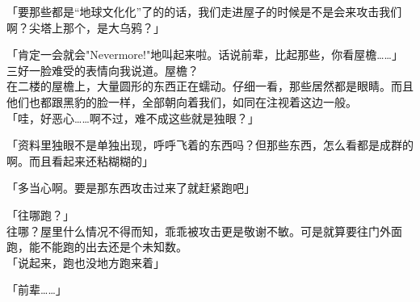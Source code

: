 「要那些都是“地球文化化”了的的话，我们走进屋子的时候是不是会来攻击我们啊？尖塔上那个，是大乌鸦？」

「肯定一会就会"Nevermore!"地叫起来啦。话说前辈，比起那些，你看屋檐……」\\

三好一脸难受的表情向我说道。屋檐？\\

在二楼的屋檐上，大量圆形的东西正在蠕动。仔细一看，那些居然都是眼睛。而且他们也都跟黑豹的脸一样，全部朝向着我们，如同在注视着这边一般。\\

「哇，好恶心……啊不过，难不成这些就是独眼？」

「资料里独眼不是单独出现，呼呼飞着的东西吗？但那些东西，怎么看都是成群的啊。而且看起来还粘糊糊的」

「多当心啊。要是那东西攻击过来了就赶紧跑吧」

「往哪跑？」\\

往哪？屋里什么情况不得而知，乖乖被攻击更是敬谢不敏。可是就算要往门外面跑，能不能跑的出去还是个未知数。\\

「说起来，跑也没地方跑来着」

「前辈……」\\

